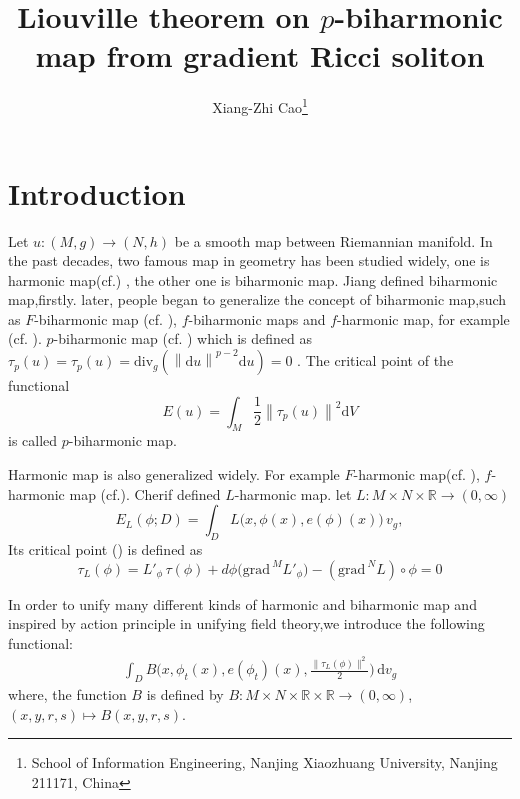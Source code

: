 \documentclass[12pt,UTF8]{article}
\title{  Liouville theorem on  $p$-biharmonic map from gradient Ricci soliton}
\author{Xiang-Zhi Cao\thanks{School of Information Engineering, Nanjing Xiaozhuang University, Nanjing 211171, China}}
\theoremstyle{plain}
\theoremstyle{definition}
\def\d {\mathrm{d}}
\def\div{\mathrm{div}}
\def\R{{\Bbb R}}
\renewcommand{\d}[1]{\mathbb{#1}}
\renewcommand{\(}{\left(}
\renewcommand{\)}{\right)}
\DeclareMathOperator*{\grad}{grad}
\newcommand{\norm}[1]{\left\lVert#1\right\rVert}%
\def\grad{\mathrm{grad\, }}
\numberwithin{equation}{subsection}
\renewcommand{\div}{\mbox{div }}
\renewcommand{\(}{\left(}
\renewcommand{\)}{\right)}
\def\d{\mathrm{d}}
\def\R{\mathbb{R}}
\def \d {\mathrm{d}}
\def \div{\mathrm{div}}
\numberwithin{equation}{section}
\begin{document}
	\maketitle 
	\section{Introduction}
	
	Let $u:(M,g) \to (N,h)$ be  a smooth map  between Riemannian manifold. In the past decades, two famous map in geometry  has been studied widely, one is harmonic map(cf.\cite{MR164306}) , the other one is biharmonic map.  Jiang \cite{zbMATH05779520} defined biharmonic map,firstly. later, people began to generalize the concept of biharmonic map,such as  $F$-biharmonic map (cf.\cite{zbMATH06287169,zbMATH07642828} ), $f$-biharmonic maps and $f$-harmonic map, for example (cf. \cite{zbMATH06834772,zbMATH07076904,zbMATH06834772,zbMATH06149656,zbMATH05791335,zbMATH08101530,zbMATH06182078,zbMATH06149656}). $p$-biharmonic map (cf. \cite{MR4169439}) which is defined as $\tau_p(u)=\tau_p(u)=\div_g( \norm{\d u}^{p-2}\d u)=0$ . The critical point of 
	the functional 
	$$ E(u)=\int_M \frac{1}{2} \norm{\tau_p(u)}^2\d V $$  
	is called $p$-biharmonic map.
	
		
	Harmonic map is also generalized  widely. For example	$F$-harmonic map(cf. \cite{MR1820701,MR1700595}), $ f$-harmonic map (cf.\cite{MR3255005,MR3681112}).	
	Cherif\cite{zbMATH06527253}   defined $L$-harmonic map.  let $L:M\times N\times\R \to(0,\infty)$
	\begin{equation}
		E_L(\phi;D) = \int_D L\!\bigl(x,\phi(x),e(\phi)(x)\bigr)\, v_g,
	\end{equation}Its critical point (\cite{zbMATH06527253}) is defined as 
	\begin{equation}\label{eq:tauL}
		\tau_L(\phi) = L'_\phi\,\tau(\phi) + d\phi\!\bigl(\grad^M L'_\phi\bigr) - (\grad^N L)\circ\phi=0
	\end{equation}
	
In order to unify  many different kinds of harmonic and biharmonic map and inspired by action principle in unifying field theory,we introduce the following functional:
	\begin{equation}
		\begin{split}
			\int_DB\bigl(x,\phi_t(x),e(\phi_t)(x),\frac{\|\tau_L(\phi)\|^2}{2}\bigr)\,\d v_{g}
		\end{split}
	\end{equation}
	where, the function $B$ is defined by $B:M\times N\times\R  \times\R\to(0,\infty)$, $(x,y,r,s)\mapsto B(x,y,r,s)$.
\end{document}
